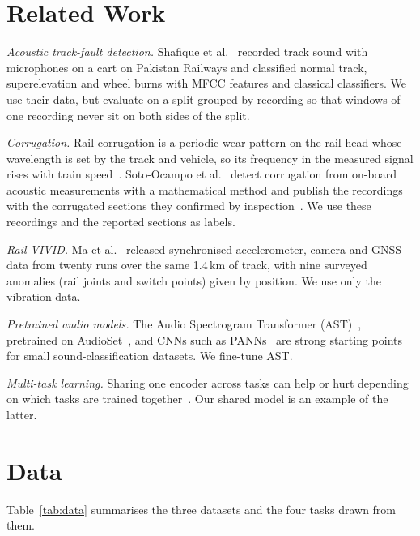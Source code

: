 \documentclass[conference]{IEEEtran}
\begin{document}
\section{Related Work}

\textit{Acoustic track-fault detection.} Shafique et al.~\cite{shafique2021} recorded track sound
with microphones on a cart on Pakistan Railways and classified normal track, superelevation and
wheel burns with MFCC features and classical classifiers. We use their data, but evaluate on a
split grouped by recording so that windows of one recording never sit on both sides of the split.

\textit{Corrugation.} Rail corrugation is a periodic wear pattern on the rail head whose
wavelength is set by the track and vehicle, so its frequency in the measured signal rises with
train speed~\cite{grassie1993}. Soto-Ocampo et al.~\cite{soto2025} detect corrugation from
on-board acoustic measurements with a mathematical method and publish the recordings with the
corrugated sections they confirmed by inspection~\cite{upmcorrugation}. We use these recordings
and the reported sections as labels.

\textit{Rail-VIVID.} Ma et al.~\cite{ma2026railvivid} released synchronised accelerometer, camera
and GNSS data from twenty runs over the same 1.4\,km of track, with nine surveyed anomalies
(rail joints and switch points) given by position. We use only the vibration data.

\textit{Pretrained audio models.} The Audio Spectrogram Transformer (AST)~\cite{gong2021ast},
pretrained on AudioSet~\cite{gemmeke2017audioset}, and CNNs such as PANNs~\cite{kong2020panns} are
strong starting points for small sound-classification datasets. We fine-tune AST.

\textit{Multi-task learning.} Sharing one encoder across tasks can help or hurt depending on
which tasks are trained together~\cite{standley2020}. Our shared model is an example of the
latter.

\section{Data}
\label{sec:data}

Table~\ref{tab:data} summarises the three datasets and the four tasks drawn from them.
\end{document}
